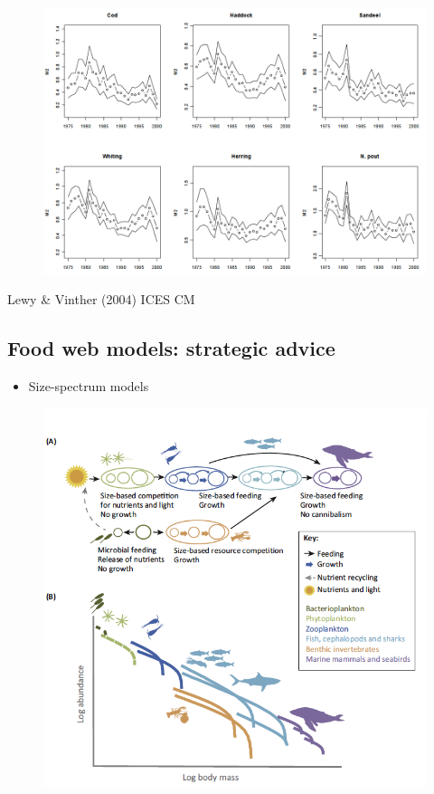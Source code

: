 \documentclass[
  letterpaper,
  DIV=11,
  numbers=noendperiod]{scrartcl}
\providecommand{\tightlist}{%
  \setlength{\itemsep}{0pt}\setlength{\parskip}{0pt}}\usepackage{longtable,booktabs,array}
\begin{document}
\begin{figure}

{\centering \includegraphics{images/sms.png}

}

\end{figure}

Lewy \& Vinther (2004) ICES CM

\hypertarget{food-web-models-strategic-advice}{%
\subsection{Food web models: strategic
advice}\label{food-web-models-strategic-advice}}

\begin{itemize}
\tightlist
\item
  Size-spectrum models
\end{itemize}

\begin{figure}

{\centering \includegraphics{images/blanch3.png}

}

\end{figure}
\end{document}
